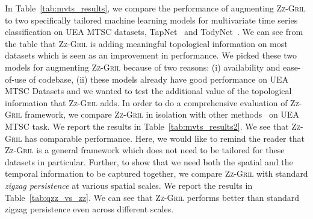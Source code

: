 \documentclass{article}
\newcommand{\zzgril}{\textsc{Zz-Gril}}
\theoremstyle{plain}
\theoremstyle{definition}
\theoremstyle{remark}
\begin{document}
In Table~\ref{tab:mvts_results}, we compare the performance of augmenting \zzgril{} to two specifically tailored machine learning models for multivariate time series classification on UEA MTSC datasets, TapNet~\cite{tapnet} and TodyNet~\cite{todynet}. We can see from the table that \zzgril{} is adding meaningful topological information on most datasets which is seen as an improvement in performance. We picked these two models for augmenting \zzgril{} because of two reasons: (i) availability and ease-of-use of codebase, (ii) these models already have good performance on UEA MTSC Datasets and we wanted to test the additional value of the topological information that \zzgril{} adds. In order to do a comprehensive evaluation of \zzgril{} framework, we compare \zzgril{} in isolation with other methods~\cite{li2021,tang2022,karim2019,schafer2017} on UEA MTSC task. We report the results in Table~\ref{tab:mvts_results2}. We see that \zzgril{} has comparable performance. Here, we would like to remind the reader that \zzgril{} is a general framework which does not need to be tailored for these datasets in particular. 
Further, to show that we need both the spatial and the temporal information to be captured together, we compare \zzgril{} with standard \emph{zigzag persistence} at various spatial scales. We report the results in Table~\ref{tab:qzz_vs_zz}. We can see that \zzgril{} performs better than standard zigzag persistence even across different scales.

\end{document}
